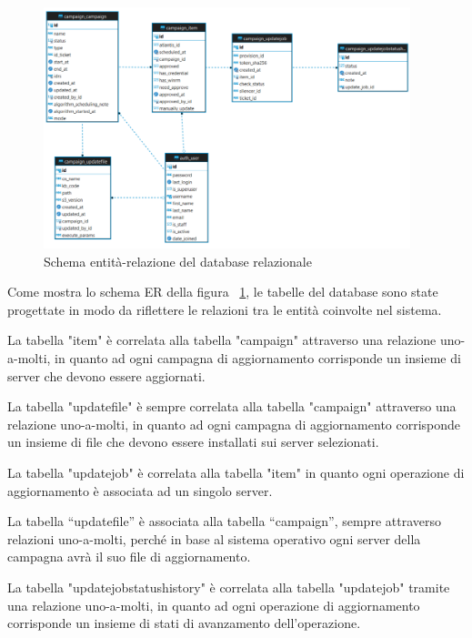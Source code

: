 \begin{figure}[H]
  \begin{flushright}
    \centering
    \includegraphics[width=0.95\textwidth]{imgs/ER_schema.png}
    \caption{Schema entità-relazione del database relazionale}
    \label{fig:Schema entità-relazione del database relazionale}
  \end{flushright}
\end{figure}

Come mostra lo schema ER della figura
~\ref{fig:Schema entità-relazione del database relazionale}, le tabelle del database sono state 
progettate in modo da riflettere le relazioni tra le entità coinvolte 
nel sistema.

La tabella "item" è correlata alla tabella "campaign" attraverso una 
relazione uno-a-molti, in quanto ad ogni campagna di aggiornamento 
corrisponde un insieme di server che devono essere aggiornati.

La tabella "updatefile" è sempre correlata alla tabella "campaign" 
attraverso una relazione uno-a-molti, in quanto ad ogni campagna di 
aggiornamento corrisponde un insieme di file che 
devono essere installati sui server selezionati.

La tabella "updatejob" è correlata alla tabella "item" in quanto ogni 
operazione di aggiornamento è associata ad un singolo server.

La tabella “updatefile” è associata alla tabella “campaign”, sempre 
attraverso relazioni uno-a-molti, perché in base al sistema operativo 
ogni server della campagna avrà il suo file di aggiornamento. 

La tabella "updatejobstatushistory" è correlata alla tabella 
"updatejob" tramite una relazione uno-a-molti, in quanto ad ogni 
operazione di aggiornamento corrisponde un insieme di stati di 
avanzamento dell'operazione.

